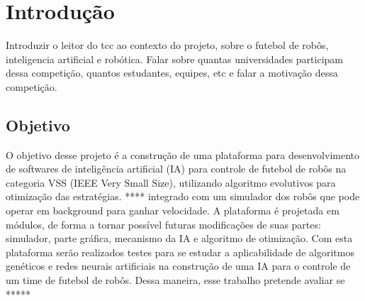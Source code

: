 
\chapter[Introdução]{Introdução}

{ 
\color{red}
Introduzir o leitor do tcc ao contexto do projeto, sobre o futebol de robôs, inteligencia artificial e robótica. Falar sobre quantas universidades participam dessa competição, quantos estudantes, equipes, etc e falar a motivação dessa competição.}




\section{Objetivo}

O objetivo desse projeto é a construção de uma plataforma para desenvolvimento de softwares de inteligência artificial (IA) para controle de futebol de robôs na categoria VSS (IEEE Very Small Size), utilizando algoritmo evolutivos para otimização das estratégias. **** integrado com um simulador dos robôs que pode operar em background para ganhar velocidade. A plataforma é projetada em módulos, de forma a tornar possível futuras modificações de suas partes: simulador, parte gráfica, mecanismo da IA e algoritmo de otimização. Com esta plataforma serão realizados testes para se estudar a aplicabilidade de algoritmos genéticos e redes neurais artificiais na construção de uma IA para o controle de um time de futebol de robôs. Dessa maneira, esse trabalho pretende avaliar se *****